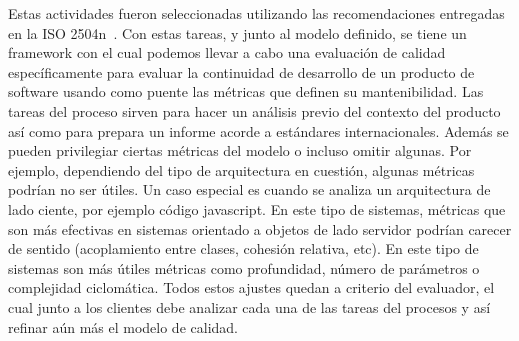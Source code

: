 Estas actividades fueron seleccionadas utilizando las recomendaciones entregadas en la ISO 2504n~\cite{25040}.
Con estas tareas, y junto al modelo definido, se tiene un framework con el cual podemos llevar a cabo
una evaluación de calidad específicamente para evaluar la continuidad de desarrollo de un producto de software
usando como puente las métricas que definen su mantenibilidad.
Las tareas del proceso sirven para hacer un análisis previo del contexto del producto así como para prepara un informe acorde a
estándares internacionales. Además se pueden privilegiar ciertas métricas del modelo o incluso omitir algunas. 
Por ejemplo, dependiendo del tipo de arquitectura en cuestión, algunas métricas podrían no ser útiles. 
Un caso especial es cuando se analiza un arquitectura de lado ciente, por
ejemplo código javascript. En este tipo de sistemas, métricas que son más efectivas en sistemas orientado a objetos de lado servidor podrían carecer
de sentido (acoplamiento entre clases, cohesión relativa, etc). En este tipo de sistemas son más útiles métricas como profundidad,
número de parámetros o complejidad ciclomática.
Todos estos ajustes quedan a criterio del evaluador, el cual junto a los clientes debe analizar cada una de las tareas del procesos y así
refinar aún más el modelo de calidad.
